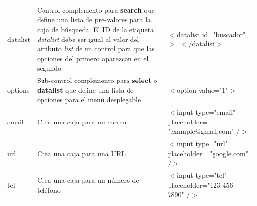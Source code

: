 \begin{table}[H]
\begin{center}
\begin{tabular}{m{2.5cm} m{7cm} m{5cm}}
            datalist        & Control complemento para \textbf{search} que define una lista de pre-valores para la caja de búsqueda. El ID de la etiqueta \textit{datalist} debe ser igual al valor del atributo \textit{list} de un control para que las opciones del primero aparezcan en el segundo                                     & \parbox{5cm}{$<$datalist id="buscador"$>$ \\ $<$/datalist$>$} \\
            options         & Sub-control complemento para \textbf{select} o \textbf{datalist} que define una lista de opciones para el menú desplegable    & $<$option value="1"$>$ \\
            email           & Crea una caja para un correo                                                                                          & \parbox{5cm}{$<$input type="email" \\ placeholder= \\ "example@gmail.com" /$>$} \\
            url             & Crea una caja para una URL                                                                                            & \parbox{5cm}{$<$input type="url" \\ placeholder= \\ "google.com" /$>$} \\
            tel             & Crea una caja para un número de teléfono                                                                               & \parbox{5cm}{$<$input type="tel" \\ placeholder="123 456 \\ 7890" /$>$} \\
            \hline
        \end{tabular}
    \end{center}
\end{table}

